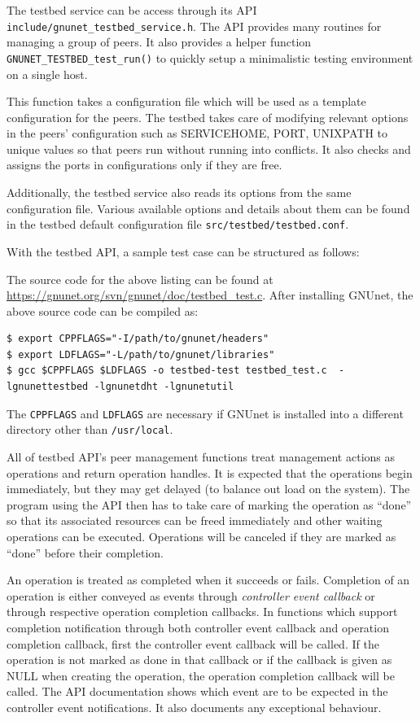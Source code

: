 \documentclass[10pt]{article}
\begin{document}
The testbed service can be access through its API
\texttt{include/gnunet\_testbed\_service.h}.  The API provides many routines for
managing a group of peers.  It also provides a helper function
\texttt{GNUNET\_TESTBED\_test\_run()} to quickly setup a minimalistic testing
environment on a single host.

This function takes a configuration file which will be used as a template
configuration for the peers.  The testbed takes care of modifying relevant
options in the peers' configuration such as SERVICEHOME, PORT, UNIXPATH to
unique values so that peers run without running into conflicts.  It also checks
and assigns the ports in configurations only if they are free.

Additionally, the testbed service also reads its options from the same
configuration file.  Various available options and details about them can be
found in the testbed default configuration file \texttt{src/testbed/testbed.conf}.

With the testbed API, a sample test case can be structured as follows:

The source code for the above listing can be found at
\url{https://gnunet.org/svn/gnunet/doc/testbed_test.c}.  After installing GNUnet, the above source code can be compiled as:
\lstset{language=bash}
\begin{lstlisting}
$ export CPPFLAGS="-I/path/to/gnunet/headers"
$ export LDFLAGS="-L/path/to/gnunet/libraries"
$ gcc $CPPFLAGS $LDFLAGS -o testbed-test testbed_test.c  -lgnunettestbed -lgnunetdht -lgnunetutil
\end{lstlisting}
The \texttt{CPPFLAGS} and \texttt{LDFLAGS} are necessary if GNUnet is installed
into a different directory other than \texttt{/usr/local}.

All of testbed API's peer management functions treat management actions as
operations and return operation handles.  It is expected that the operations
begin immediately, but they may get delayed (to balance out load on the system).
The program using the API then has to take care of marking the operation as
``done'' so that its associated resources can be freed immediately and other
waiting operations can be executed.  Operations will be canceled if they are
marked as ``done'' before their completion.

An operation is treated as completed when it succeeds or fails.  Completion of
an operation is either conveyed as events through \textit{controller event
  callback} or through respective operation completion callbacks.  In functions
which support completion notification through both controller event callback and
operation completion callback, first the controller event callback will be
called.  If the operation is not marked as done in that callback or if the
callback is given as NULL when creating the operation, the operation completion
callback will be called.  The API documentation shows which event are to be
expected in the controller event notifications.  It also documents any
exceptional behaviour.
\end{document}

